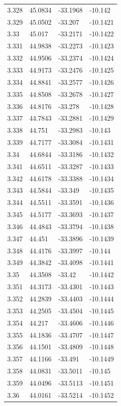 \begin{tabular}{llll}
3.328 & 45.0834 & -33.1968 & -10.142 \\
3.329 & 45.0502 & -33.207 & -10.1421 \\
3.33 & 45.017 & -33.2171 & -10.1422 \\
3.331 & 44.9838 & -33.2273 & -10.1423 \\
3.332 & 44.9506 & -33.2374 & -10.1424 \\
3.333 & 44.9173 & -33.2476 & -10.1425 \\
3.334 & 44.8841 & -33.2577 & -10.1426 \\
3.335 & 44.8508 & -33.2678 & -10.1427 \\
3.336 & 44.8176 & -33.278 & -10.1428 \\
3.337 & 44.7843 & -33.2881 & -10.1429 \\
3.338 & 44.751 & -33.2983 & -10.143 \\
3.339 & 44.7177 & -33.3084 & -10.1431 \\
3.34 & 44.6844 & -33.3186 & -10.1432 \\
3.341 & 44.6511 & -33.3287 & -10.1433 \\
3.342 & 44.6178 & -33.3388 & -10.1434 \\
3.343 & 44.5844 & -33.349 & -10.1435 \\
3.344 & 44.5511 & -33.3591 & -10.1436 \\
3.345 & 44.5177 & -33.3693 & -10.1437 \\
3.346 & 44.4843 & -33.3794 & -10.1438 \\
3.347 & 44.451 & -33.3896 & -10.1439 \\
3.348 & 44.4176 & -33.3997 & -10.144 \\
3.349 & 44.3842 & -33.4098 & -10.1441 \\
3.35 & 44.3508 & -33.42 & -10.1442 \\
3.351 & 44.3173 & -33.4301 & -10.1443 \\
3.352 & 44.2839 & -33.4403 & -10.1444 \\
3.353 & 44.2505 & -33.4504 & -10.1445 \\
3.354 & 44.217 & -33.4606 & -10.1446 \\
3.355 & 44.1836 & -33.4707 & -10.1447 \\
3.356 & 44.1501 & -33.4809 & -10.1448 \\
3.357 & 44.1166 & -33.491 & -10.1449 \\
3.358 & 44.0831 & -33.5011 & -10.145 \\
3.359 & 44.0496 & -33.5113 & -10.1451 \\
3.36 & 44.0161 & -33.5214 & -10.1452 \\

\end{tabular}
